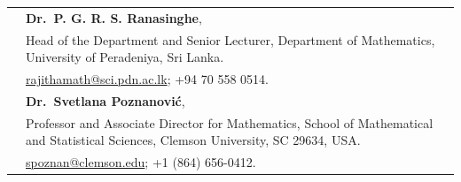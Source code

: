 \documentclass[letterpaper,11pt]{article}
\newcommand{\cvspace}{\noalign{\vskip 6pt}}
\begin{document}
\begin{longtable}[t]{@{}>{\raggedright\arraybackslash}p{1.3in}>{\raggedright\arraybackslash}p{4.8in}@{}}
\textbf{\color{OliveGreen}{References}}
& \textbf{Dr.\ P. G. R. S. Ranasinghe}, \\*
& Head of the Department and Senior Lecturer, Department of Mathematics,
University of Peradeniya, Sri Lanka. \\*
& \href{mailto:rajithamath@sci.pdn.ac.lk}{rajithamath@sci.pdn.ac.lk};
+94 70 558 0514. \\
\cvspace

& \textbf{Dr.\ Svetlana Poznanovi\'{c}}, \\*
& Professor and Associate Director for Mathematics,
School of Mathematical and Statistical Sciences,
Clemson University, SC 29634, USA. \\*
& \href{mailto:spoznan@clemson.edu}{spoznan@clemson.edu};
+1 (864) 656-0412. \\

\end{longtable}
\end{document}
